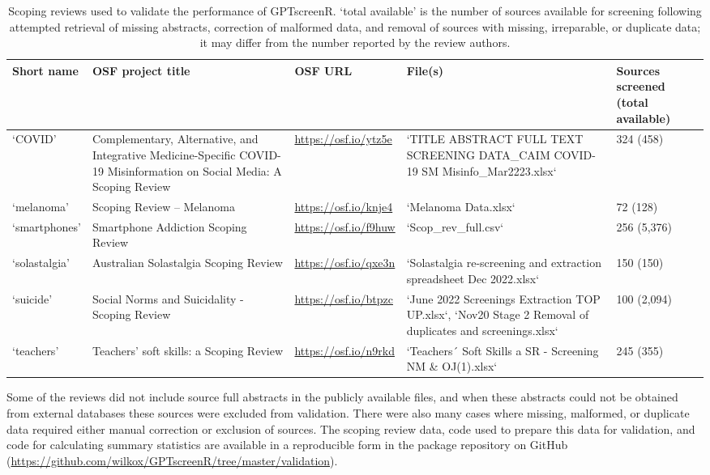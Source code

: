 \documentclass[10pt,a4paper,twocolumn]{article}
\begin{document}
\begin{table}[]
  \centering
  \caption{Scoping reviews used to validate the performance of GPTscreenR. `total available' is the number of sources available for screening following attempted retrieval of missing abstracts, correction of malformed data, and removal of sources with missing, irreparable, or duplicate data; it may differ from the number reported by the review authors.}
  \label{tab:validation_reviews}
  \begin{tabularx}{\textwidth}{lXlXp{2cm}}
    \toprule
    Short name & OSF project title & OSF URL & File(s) & Sources screened (total available) \\
    \midrule
    `COVID' & Complementary, Alternative, and Integrative Medicine-Specific COVID-19 Misinformation on Social Media: A Scoping Review & \url{https://osf.io/ytz5e} & `TITLE ABSTRACT FULL TEXT SCREENING DATA\_CAIM COVID-19 SM Misinfo\_Mar2223.xlsx` & 324 (458) \\
    `melanoma' & Scoping Review – Melanoma & \url{https://osf.io/knje4} & `Melanoma Data.xlsx` & 72 (128) \\
    `smartphones' & Smartphone Addiction Scoping Review & \url{https://osf.io/f9huw} & `Scop\_rev\_full.csv` & 256 (5,376) \\
    `solastalgia' & Australian Solastalgia Scoping Review & \url{https://osf.io/qxe3n} & `Solastalgia re-screening and extraction spreadsheet Dec 2022.xlsx` & 150 (150) \\
    `suicide' & Social Norms and Suicidality - Scoping Review & \url{https://osf.io/btpzc} & `June 2022 Screenings Extraction TOP UP.xlsx`, `Nov20 Stage 2 Removal of duplicates and screenings.xlsx` & 100 (2,094) \\
    `teachers' & Teachers' soft skills: a Scoping Review & \url{https://osf.io/n9rkd} & `Teachers´ Soft Skills a SR - Screening NM \& OJ(1).xlsx` & 245 (355) \\
    \bottomrule
  \end{tabularx}
\end{table}

Some of the reviews did not include source full abstracts in the publicly available files, and when these abstracts could not be obtained from external databases these sources were excluded from validation. There were also many cases where missing, malformed, or duplicate data required either manual correction or exclusion of sources. The scoping review data, code used to prepare this data for validation, and code for calculating summary statistics are available in a reproducible form in the package repository on GitHub (\url{https://github.com/wilkox/GPTscreenR/tree/master/validation}).
\end{document}
